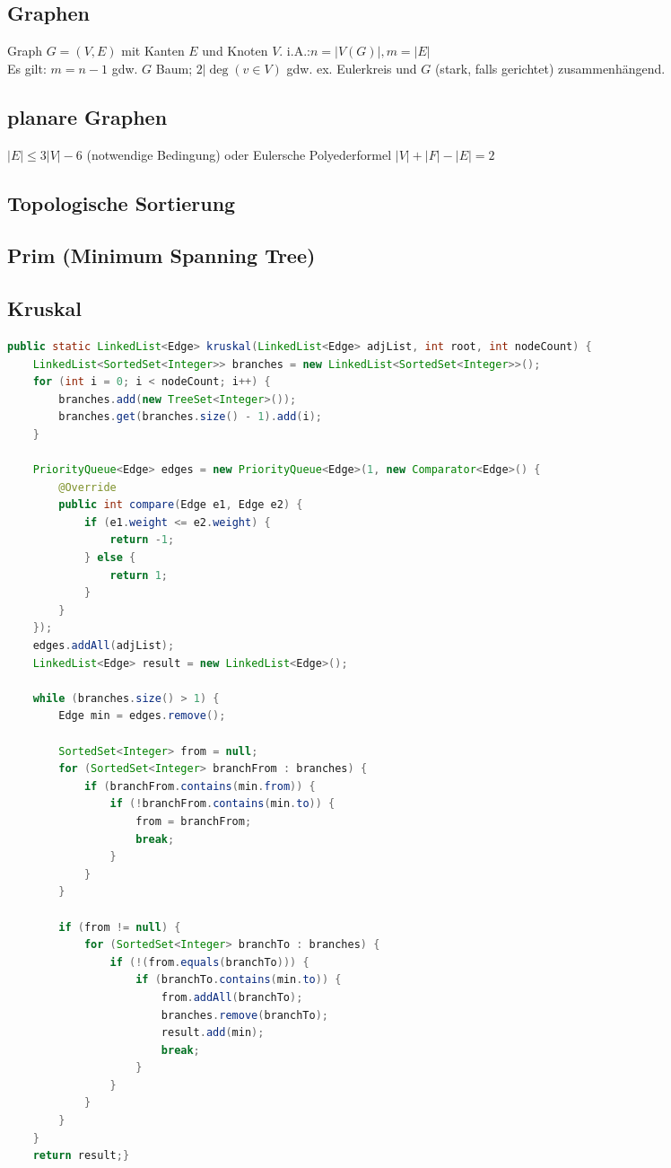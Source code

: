 \documentclass[10pt,a4paper,ngerman,oneside,]{article}
\begin{document}
\begin{multicols}{2}
\section{Graphen}
Graph $G=(V,E)$ mit Kanten $E$ und Knoten $V$. i.A.:$n=|V(G)|, m=|E|$\\
Es gilt: $m=n-1$ gdw. $G$ Baum; $2|\deg(v\in V)$ gdw. ex. Eulerkreis und $G$ (stark, falls gerichtet) zusammenhängend.
\subsection{planare Graphen}
$|E|\leq3|V|-6$ (notwendige Bedingung)
oder Eulersche Polyederformel $|V|+|F|-|E|=2$
\subsection{Topologische Sortierung}
\subsection{Prim (Minimum Spanning Tree)}

\subsection{Kruskal}
\begin{lstlisting}[language=java]
public static LinkedList<Edge> kruskal(LinkedList<Edge> adjList, int root, int nodeCount) {
	LinkedList<SortedSet<Integer>> branches = new LinkedList<SortedSet<Integer>>();
	for (int i = 0; i < nodeCount; i++) {
		branches.add(new TreeSet<Integer>());
		branches.get(branches.size() - 1).add(i);
	}

	PriorityQueue<Edge> edges = new PriorityQueue<Edge>(1, new Comparator<Edge>() {
		@Override
		public int compare(Edge e1, Edge e2) {
			if (e1.weight <= e2.weight) {
				return -1;
			} else {
				return 1;
			}
		}
	});
	edges.addAll(adjList);
	LinkedList<Edge> result = new LinkedList<Edge>();

	while (branches.size() > 1) {
		Edge min = edges.remove();

		SortedSet<Integer> from = null;
		for (SortedSet<Integer> branchFrom : branches) {
			if (branchFrom.contains(min.from)) {
				if (!branchFrom.contains(min.to)) {
					from = branchFrom;
					break;
				}
			}
		}

		if (from != null) {
			for (SortedSet<Integer> branchTo : branches) {
				if (!(from.equals(branchTo))) {
					if (branchTo.contains(min.to)) {
						from.addAll(branchTo);
						branches.remove(branchTo);
						result.add(min);
						break;
					}
				}
			}
		}
	}
	return result;}		
\end{lstlisting}

\end{multicols}
\end{document}
